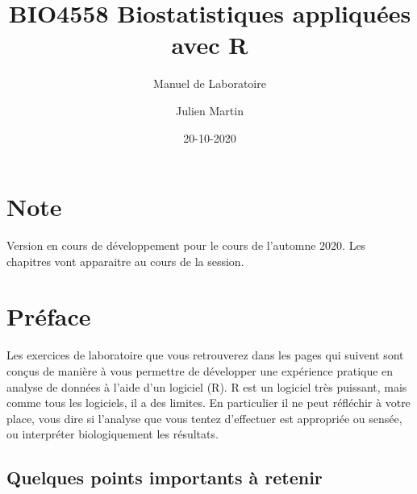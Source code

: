 \documentclass[12pt,]{book}
\title{BIO4558 Biostatistiques appliquées avec R}
\subtitle{Manuel de Laboratoire}
\author{Julien Martin}
\date{20-10-2020}
\begin{document}
\maketitle



{
\setcounter{tocdepth}{1}
\tableofcontents
}
\hypertarget{note}{%
\chapter*{Note}\label{note}}

Version en cours de développement pour le cours de l'automne 2020. Les chapitres vont apparaitre au cours de la session.

\hypertarget{pruxe9face}{%
\chapter*{Préface}\label{pruxe9face}}

Les exercices de laboratoire que vous retrouverez dans les pages qui suivent sont conçus de manière à vous permettre de développer une expérience pratique en analyse de données à l'aide d'un logiciel (R).
R est un logiciel très puissant, mais comme tous les logiciels, il a des limites.
En particulier il ne peut réfléchir à votre place, vous dire si l'analyse que vous tentez d'effectuer est appropriée ou sensée, ou interpréter biologiquement les résultats.

\hypertarget{quelques-points-importants-uxe0-retenir}{%
\section*{Quelques points importants à retenir}\label{quelques-points-importants-uxe0-retenir}}
\end{document}
